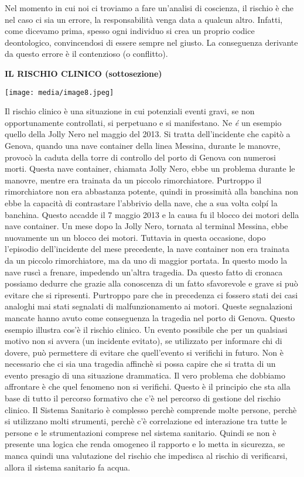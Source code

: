 \documentclass[]{article}
\begin{document}
Nel momento in cui noi ci troviamo a fare un'analisi di coscienza, il
rischio è che nel caso ci sia un errore, la responsabilità venga data a
qualcun altro. Infatti, come dicevamo prima, spesso ogni individuo si
crea un proprio codice deontologico, convincendosi di essere sempre nel
giusto. La conseguenza derivante da questo errore è il contenzioso (o
conflitto).

\textbf{IL RISCHIO CLINICO (sottosezione)}

\texttt{[image: media/image8.jpeg]}

Il rischio clinico è una situazione in cui potenziali eventi gravi, se
non opportunamente controllati, si perpetuano e si manifestano. Ne
\emph{é} un esempio quello della Jolly Nero nel maggio del 2013. Si
tratta dell'incidente che capitò a Genova, quando una nave container
della linea Messina, durante le manovre, provocò la caduta della torre
di controllo del porto di Genova con numerosi morti. Questa nave
container, chiamata Jolly Nero, ebbe un problema durante le manovre,
mentre era trainata da un piccolo rimorchiatore. Purtroppo il
rimorchiatore non era abbastanza potente, quindi in prossimità alla
banchina non ebbe la capacità di contrastare l'abbrivio della nave, che
a sua volta colpí la banchina. Questo accadde il 7 maggio 2013 e la
causa fu il blocco dei motori della nave container. Un mese dopo la
Jolly Nero, tornata al terminal Messina, ebbe nuovamente un un blocco
dei motori. Tuttavia in questa occasione, dopo l'episodio dell'incidente
del mese precedente, la nave container non era trainata da un piccolo
rimorchiatore, ma da uno di maggior portata. In questo modo la nave
ruscì a frenare, impedendo un'altra tragedia. Da questo fatto di cronaca
possiamo dedurre che grazie alla conoscenza di un fatto sfavorevole e
grave si può evitare che si ripresenti. Purtroppo pare che in precedenza
ci fossero stati dei casi analoghi mai stati segnalati di
malfunzionamento ai motori. Queste segnalazioni mancate hanno avuto come
conseguenza la tragedia nel porto di Genova. Questo esempio illustra
cos'è il rischio clinico. Un evento possibile che per un qualsiasi
motivo non si avvera (un incidente evitato), se utilizzato per informare
chi di dovere, può permettere di evitare che quell'evento si verifichi
in futuro. Non è necessario che ci sia una tragedia affinchè si possa
capire che si tratta di un evento presagio di una situazione drammatica.
Il vero problema che dobbiamo affrontare è che quel fenomeno non si
verifichi. Questo è il principio che sta alla base di tutto il percorso
formativo che c'è nel percorso di gestione del rischio clinico. Il
Sistema Sanitario è complesso perchè comprende molte persone, perchè si
utilizzano molti strumenti, perchè c'è correlazione ed interazione tra
tutte le persone e le strumentazioni comprese nel sistema sanitario.
Quindi se non è presente una logica che renda omogeneo il rapporto e lo
metta in sicurezza, se manca quindi una valutazione del rischio che
impedisca al rischio di verificarsi, allora il sistema sanitario fa
acqua.
\end{document}
